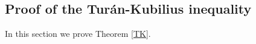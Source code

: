 \documentclass[11pt]{amsart}
\theoremstyle{definition}
\newcommand{\NN}{{\mathcal N}}
\newcommand{\WS}[1]{{\color{blue}{{#1}}}}
\begin{document}



\subsection{Proof of the Tur\'an-Kubilius inequality} In this section we prove Theorem \ref{TK}.
\end{document}
